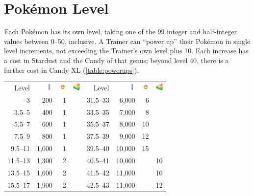 \section{Pokémon Level}
\label{sec:plevel}
Each Pokémon has its own level, taking one of the 99 integer and half-integer
 values between 0--50, inclusive.
A Trainer can ``power up'' their Pokémon in single level increments,
 not exceeding the Trainer's own level plus 10.
Each increase has a cost in Stardust and the Candy of that genus; beyond level 40, there
  is a further cost in Candy XL (\autoref{table:powerups}).
\begin{table}
\centering
\begin{tabular}[ht]{rrrr|rrrr}
Level &
\includegraphics[width=1em,height=1em]{images/stardust.png} &
\includegraphics[width=1em,height=1em]{images/rarecandy.png} &
\includegraphics[width=1em,height=1em]{images/rarecandyxl.png} &
Level &
\includegraphics[width=1em,height=1em]{images/stardust.png} &
\includegraphics[width=1em,height=1em]{images/rarecandy.png} &
\includegraphics[width=1em,height=1em]{images/rarecandyxl.png} \\
\Midrule
1.5--3 &   200 & 1 & & 31.5--33 &  6,000 &  6 & \\
3.5--5 &   400 & 1 & & 33.5--35 &  7,000 &  8 & \\
5.5--7 &   600 & 1 & & 35.5--37 &  8,000 & 10 & \\
7.5--9 &   800 & 1 & & 37.5--39 &  9,000 & 12 & \\
9.5--11 & 1,000 & 1 & & 39.5--40 & 10,000 & 15 & \\
11.5--13 & 1,300 & 2 & & 40.5--41 & 10,000 &    & 10 \\
13.5--15 & 1,600 & 2 & & 41.5--42 & 11,000 &    & 10 \\
15.5--17 & 1,900 & 2 & & 42.5--43 & 11,000 &    & 12 \\

\end{tabular}
\end{table}
